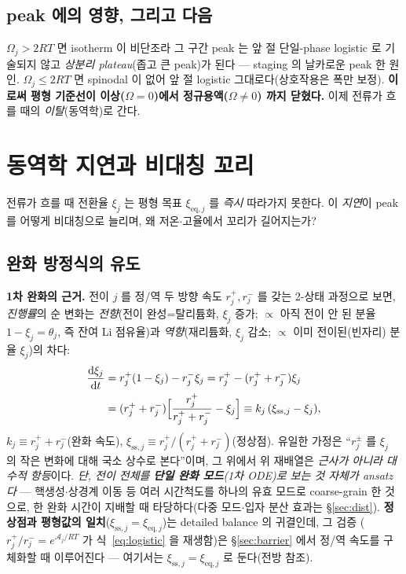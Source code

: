 \documentclass[11pt,a4paper]{article}
\newcommand{\dd}{\mathrm{d}}
\newcommand{\eq}{\mathrm{eq}}
\newcommand{\sstat}{\mathrm{ss}}
\begin{document}
\subsection{peak 에의 영향, 그리고 다음}
$\Omega_j>2RT$ 면 isotherm 이 비단조라 그 구간 peak 는 앞 절 단일-phase logistic 로 기술되지 않고 \emph{상분리
plateau}(좁고 큰 peak)가 된다 — staging 의 날카로운 peak 한 원인. $\Omega_j\le2RT$ 면 spinodal 이 없어 앞 절
logistic 그대로다(상호작용은 폭만 보정). \textbf{이로써 평형 기준선이 이상($\Omega=0$)에서 정규용액($\Omega\ne0$)
까지 닫혔다.} 이제 전류가 흐를 때의 \emph{이탈}(동역학)로 간다.

\section{동역학 지연과 비대칭 꼬리}\label{sec:lag}
전류가 흐를 때 전환율 $\xi_j$ 는 평형 목표 $\xi_{\eq,j}$ 를 \emph{즉시} 따라가지 못한다. 이
\emph{지연}이 peak 를 어떻게 비대칭으로 늘리며, 왜 저온$\cdot$고율에서 꼬리가 길어지는가?

\subsection{완화 방정식의 유도}
\textbf{1차 완화의 근거.} 전이 $j$ 를 정/역 두 방향 속도 $r_j^+,r_j^-$ 를 갖는 2-상태 과정으로 보면, \emph{진행률}의
순 변화는 \emph{전향}(전이 완성=탈리튬화, $\xi_j$ 증가; $\propto$ 아직 전이 안 된 분율 $1-\xi_j=\theta_j$, 즉 잔여 Li
점유율)과 \emph{역향}(재리튬화, $\xi_j$ 감소; $\propto$ 이미 전이된(빈자리) 분율 $\xi_j$)의 차다:
\begin{align}
\frac{\dd\xi_j}{\dd t}&=r_j^+(1-\xi_j)-r_j^-\xi_j
=r_j^+-(r_j^++r_j^-)\xi_j\notag\\
&=(r_j^++r_j^-)\Big[\frac{r_j^+}{r_j^++r_j^-}-\xi_j\Big]
\equiv k_j\,(\xi_{\sstat,j}-\xi_j),
\label{eq:relax}
\end{align}
$k_j\equiv r_j^++r_j^-$(완화 속도), $\xi_{\sstat,j}\equiv r_j^+/(r_j^++r_j^-)$(정상점). 유일한 가정은 ``$r_j^\pm$ 를
$\xi_j$ 의 작은 변화에 대해 국소 상수로 본다''이며, 그 위에서 위 재배열은 \emph{근사가 아니라 대수적 항등}이다.
\emph{단, 전이 전체를 \textbf{단일 완화 모드}(1차 ODE)로 보는 것 자체가 ansatz 다} — 핵생성$\cdot$상경계 이동 등
여러 시간척도를 하나의 유효 모드로 coarse-grain 한 것으로, 한 완화 시간이 지배할 때 타당하다(다중 모드$\cdot$입자
분산 효과는 \S\ref{sec:dist}).
\textbf{정상점과 평형값의 일치}($\xi_{\sstat,j}=\xi_{\eq,j}$)는 detailed balance 의 귀결인데, 그 검증
($r_j^+/r_j^-=e^{\mathcal A_j/RT}$ 가 식~\eqref{eq:logistic} 을 재생함)은 \S\ref{sec:barrier} 에서 정/역 속도를
구체화할 때 이루어진다 — 여기서는 $\xi_{\sstat,j}=\xi_{\eq,j}$ 로 둔다(전방 참조).
\end{document}
